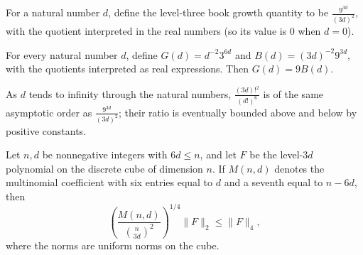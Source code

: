 \begin{definition}
\label{FABL.levelThreeBookGrowth}
\leanok
For a natural number $d$, define the level-three book growth quantity to be
$\displaystyle\frac{9^{3d}}{(3d)^2}$, with the quotient interpreted in the real numbers
(so its value is $0$ when $d=0$).
\end{definition}

\begin{theorem}
\label{FABL.levelThreeGrowth_eq_nine_mul_bookGrowth}
\leanok
{}
For every natural number $d$, define $G(d)=d^{-2}3^{6d}$ and $B(d)=(3d)^{-2}9^{3d}$,
with the quotients interpreted as real expressions. Then $G(d)=9B(d)$.
\end{theorem}

\begin{theorem}
\label{FABL.levelThreeFactorialConstant_isTheta_bookGrowth}
\leanok
{}
As $d$ tends to infinity through the natural numbers, $\frac{(3d)!^2}{(d!)^6}$ is of the
same asymptotic order as $\frac{9^{3d}}{(3d)^2}$; their ratio is eventually bounded
above and below by positive constants.
\end{theorem}

\begin{theorem}
\label{FABL.exercise9_3_uniformLpNorm_lower_bound}
\leanok
{}
Let $n,d$ be nonnegative integers with $6d\leq n$, and let $F$ be the level-$3d$
polynomial on the discrete cube of dimension $n$. If $M(n,d)$ denotes the multinomial
coefficient with six entries equal to $d$ and a seventh equal to $n-6d$, then
\[
\left(\frac{M(n,d)}{\binom{n}{3d}^{2}}\right)^{1/4}\|F\|_2\leq \|F\|_4,
\]
where the norms are uniform norms on the cube.
\end{theorem}

